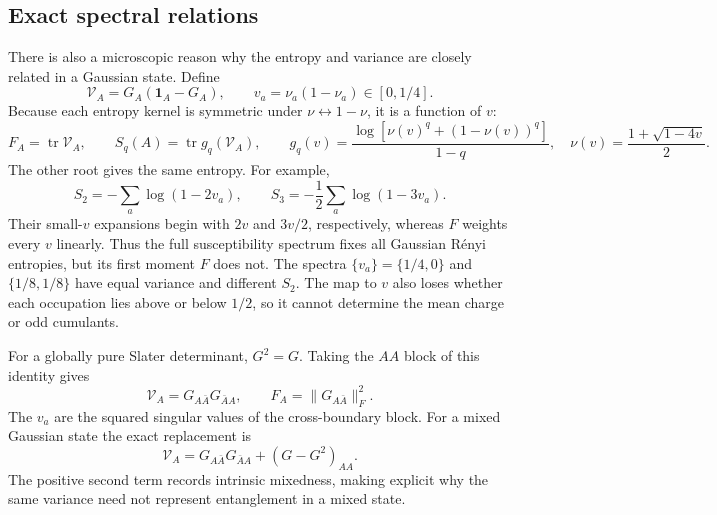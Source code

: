 \documentclass[aps,prb,onecolumn,nofootinbib,superscriptaddress]{revtex4-2}
\newcommand{\Id}{\mathbf{1}}
\newcommand{\tr}{\operatorname{tr}}
\begin{document}
\subsection{Exact spectral relations}
There is also a microscopic reason why the entropy and variance are closely
related in a Gaussian state. Define
\begin{equation}
 \mathcal V_A=G_A(\Id_A-G_A),\qquad
 v_a=\nu_a(1-\nu_a)\in[0,1/4].
 \label{eq:V}
\end{equation}
Because each entropy kernel is symmetric under $\nu\leftrightarrow1-\nu$,
it is a function of $v$:
\begin{equation}
 F_A=\tr\mathcal V_A,\qquad
 S_q(A)=\tr g_q(\mathcal V_A),\qquad
 g_q(v)=\frac{\log[\nu(v)^q+(1-\nu(v))^q]}{1-q},\quad
 \nu(v)=\frac{1+\sqrt{1-4v}}{2}.
 \label{eq:V-entropies}
\end{equation}
The other root gives the same entropy. For example,
\begin{equation}
 S_2=-\sum_a\log(1-2v_a),\qquad
 S_3=-\frac12\sum_a\log(1-3v_a).
 \label{eq:q23}
\end{equation}
Their small-$v$ expansions begin with $2v$ and $3v/2$, respectively,
whereas $F$ weights every $v$ linearly. Thus the full susceptibility
spectrum fixes all Gaussian R\'enyi entropies, but its first moment $F$
does not. The spectra $\{v_a\}=\{1/4,0\}$ and $\{1/8,1/8\}$ have equal
variance and different $S_2$. The map to $v$ also loses whether each
occupation lies above or below $1/2$, so it cannot determine the mean
charge or odd cumulants.

For a globally pure Slater determinant, $G^2=G$. Taking the $AA$ block
of this identity gives
\begin{equation}
 \mathcal V_A=G_{A\bar A}G_{\bar A A},\qquad
 F_A=\|G_{A\bar A}\|_F^2.
 \label{eq:pure-cross-block}
\end{equation}
The $v_a$ are the squared singular values of the cross-boundary block.
For a mixed Gaussian state the exact replacement is
\begin{equation}
 \mathcal V_A=G_{A\bar A}G_{\bar A A}+(G-G^2)_{AA}.
 \label{eq:mixed-cross-block}
\end{equation}
The positive second term records intrinsic mixedness, making explicit why
the same variance need not represent entanglement in a mixed state.
\end{document}
